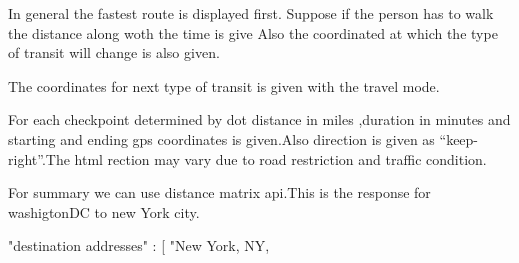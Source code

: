 \documentclass{article}
\begin{document}
In general the fastest route is displayed first.
Suppose if the person has to walk the distance along woth the time is give Also the coordinated at which the type of transit will change is also given.

The coordinates for next type of transit is given with the travel mode.

For each checkpoint determined by dot distance in miles ,duration in minutes and starting and ending gps coordinates is given.Also direction is given as “keep-right”.The html rection may vary due to road restriction and traffic condition.

For summary we can use distance matrix api.This is the response for washigtonDC to new York city.


   "destination addresses" : [ "New York, NY, 
   
\end{document}
